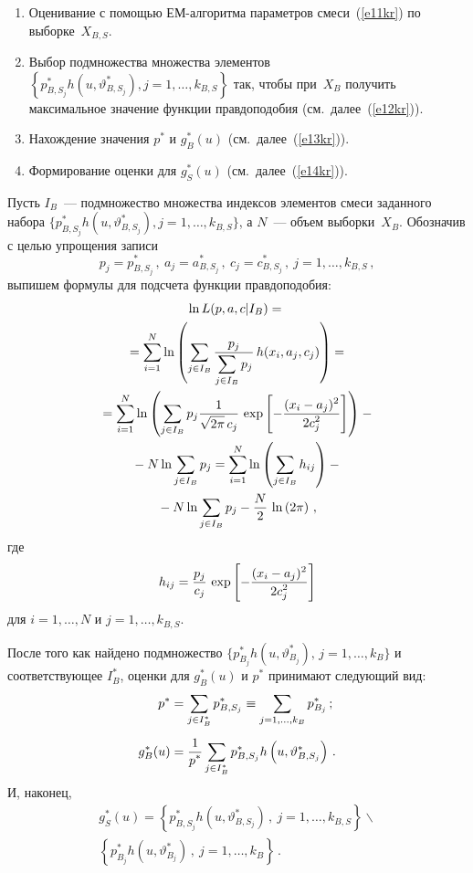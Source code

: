 \begin{multicols}{2}
\noindent
\begin{enumerate}[1.]
\item Оценивание с помощью ЕМ-алгоритма па\-ра\-мет\-ров смеси~(\ref{e11kr}) 
по выборке~$X_{B,S}$.
\item Выбор подмножества множества элементов 
$\left \{ p_{B,S_j}^* h\left( u,\vartheta_{B,S_j}^*\right ), j=1,\ldots ,k_{B,S}\right \}$ так, чтобы 
при~$X_B$ получить максимальное значение функции правдоподобия (см.\ 
далее~(\ref{e12kr})).
\item Нахождение значения $p^*$ и $g_B^*(u)$ (см.\ далее~(\ref{e13kr})).
\item Формирование оценки для $g_S^*(u)$ (см.\ далее~(\ref{e14kr})). 
\end{enumerate}

\bigskip
     Пусть $I_B$~--- подмножество множества индексов элементов смеси 
заданного набора $\{ p_{B,S_j}^* h(u, \vartheta_{B,S_j}^*), j=1,\ldots , k_{B,S}\}$, 
а $N$~--- объем выборки~$X_B$. Обозначив с целью упрощения записи 
$$
p_j =  p_{B,S_j}^*\,,\  
a_j = a_{B,S_j}^*\,,\  
c_j=c_{B,S_j}^*\,, \ j=1,\ldots ,k_{B,S}\,,
$$ 
выпишем формулы для подсчета функции правдоподобия:
     \begin{multline}
   \ln L (p,a,c\vert I_B) ={}\\
   {}= \sum\limits_{i=1}^N \ln\left ( \sum\limits_{j\in I_B }
     \displaystyle\frac{\displaystyle p_j\mathstrut}{\displaystyle \sum\limits_{j\in I_B}p_{j}\mathstrut}\,h(x_i, a_j, c_j )\right )={}\\
     {}=\sum\limits_{i=1}^N\ln \left ( \sum\limits_{j\in I_B} p_j 
\displaystyle\frac{\displaystyle 1\mathstrut}{\displaystyle \sqrt{2\pi}\,c_j\mathstrut}\,\exp\left [
     -\displaystyle\frac{\displaystyle (x_i -a_j)^2\mathstrut}{\displaystyle 2c_j^2\mathstrut}\right ]\right ) -{}\\
     {}- N\ln \sum\limits_{j\in I_B} p_j =
    \sum\limits_{i=1}^N \ln \left ( \sum\limits_{j\in I_B} h_{ij}\right ) -{}\\
    {}-N\ln 
\sum\limits_{j\in I_B} p_j -\displaystyle\frac{\displaystyle N\mathstrut}{\displaystyle 2\mathstrut}\,\ln\left (2\pi\right )\,,
     \label{e12kr}
     \end{multline}
где 
$$
h_{ij} = \displaystyle\frac{\displaystyle p_j\mathstrut}{\displaystyle c_j\mathstrut}\,\exp \left [ -\displaystyle\frac{\displaystyle (x_i-a_j)^2\mathstrut}{\displaystyle 2c_j^2\mathstrut}\right ]
$$
для $i=1,\ldots ,N$ и $j=1,\ldots ,k_{B,S}$.
     
     После того как найдено подмножество $\{ p_{B_j}^* h(u,\vartheta_{B_j}^*),\, 
j=1,\ldots ,k_B\}$ и соответствующее $I_B^*$, оценки для $g_B^*(u)$ и $p^*$ 
принимают следующий вид:
     \begin{align}
     p^* & = \sum\limits_{j\in I_B^*} p_{B,S_j}^*\equiv \sum\limits_{j=1,\ldots , 
k_B} p_{B_j}^*\,;\notag\\[-6pt]
     &\label{e13kr}\\[-6pt]
     g_B^*(u) & = \displaystyle\frac{\displaystyle 1\mathstrut}{\displaystyle p^*\mathstrut}\sum\limits_{j\in I_B^*}  p_{B,S_j}^* h\left ( u, 
\vartheta_{B,S_j}^* \right)\,.\notag
     \end{align}
     И, наконец, 
     \begin{multline}
     g_S^*(u) = \left \{ p_{B,S_j}^* h\left ( u,\vartheta_{B,S_j}^*\right )\,, \ j=1,\ldots ,k_{B,S}\right \} 
\backslash\\
\left  \{p_{B_j}^* h\left ( u, \vartheta_{B_j}^*\right )\,,\  j=1,\ldots ,k_B\right \}\,.
     \label{e14kr}
     \end{multline}


\end{multicols}
